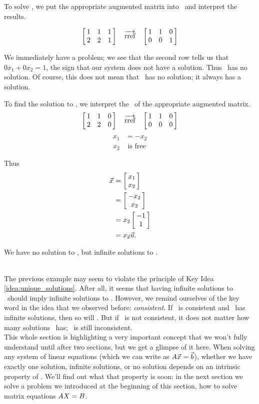 {To solve \ttaxb, we put the appropriate augmented matrix into \rref\ and interpret the results.

$$\bmx{ccc}1&1&1\\2&2&1\emx \quad \arref \quad \bmx{ccc}1&1&0\\0&0&1\emx$$

We immediately have a problem; we see that the second row tells us that $0x_1+0x_2 = 1$, the sign that  our system does not have a solution. Thus \ttaxb\ has no solution. Of course, this does not mean that \ttaxo\ has no solution; it always has a solution.

To find the solution to \ttaxo, we interpret the \rref\ of the appropriate augmented matrix. $$\bmx{ccc}1&1&0\\2&2&0\emx \quad \arref \quad \bmx{ccc}1&1&0\\0&0&0\emx$$ \begin{align*} x_1 &=-x_2 \\ x_2 &\text{ is free} \end{align*} 

Thus \begin{align*}\vx &= \bmx{c} x_1\\x_2\emx\\
&= \bmx{c}-x_2\\x_2\emx \\
&= x_2\bmx{c}-1\\1\emx \\
&= x_2\vu.\end{align*} 

We have no solution to \ttaxb, but infinite solutions to \ttaxo.}\\ %

The previous example may seem to violate the principle of Key Idea \ref{idea:unique_solutions}. After all, it seems that having infinite solutions to \ttaxo\ should imply infinite solutions to \ttaxb. However, we remind ourselves of the key word in the idea that we observed before: \textit{consistent}. If \ttaxb\ is consistent and \ttaxo\ has infinite solutions, then so will \ttaxb. But if \ttaxb\ is not consistent, it does not matter how many solutions \ttaxo\ has; \ttaxb\ is still inconsistent.\\


This whole section is highlighting a very important concept that we won't fully understand until after two sections, but we get a glimpse of it here. When solving any system of linear equations (which we can write as $\tta\vx = \vb$), whether we have exactly one solution, infinite solutions, or no solution depends on an intrinsic property of \tta. We'll find out what that property is soon; in the next section we solve a problem we introduced at the beginning of this section, how to solve matrix equations $\tta\ttx=\ttb$.\\






